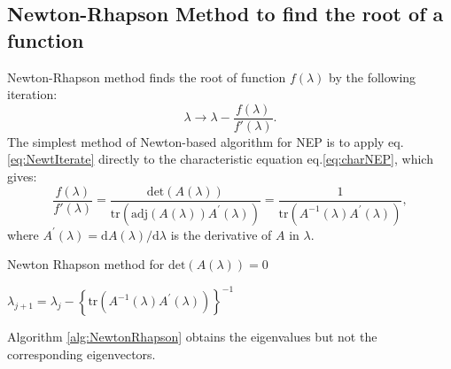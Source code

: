 \documentclass[11pt,letterpaper]{article}
\newcommand{\diff}{\mathrm{d}}
\begin{document}
\subsection{Newton-Rhapson Method to find the root of a function}
Newton-Rhapson method finds the root of function $f(\lambda)$ by the following iteration:
\begin{equation}
	\label{eq:NewtIterate}
	\lambda \rightarrow \lambda - \frac{f(\lambda)}{f'(\lambda)}.
\end{equation}
The simplest method of Newton-based algorithm for NEP is to apply eq.\ref{eq:NewtIterate} directly to the characteristic equation eq.\ref{eq:charNEP}, which gives:
\begin{equation}\label{eq:NewtonRhapson}
\frac{f(\lambda)}{f'(\lambda)} = \frac{\mathrm{det}(A(\lambda))}{ \mathrm{tr} \left( \mathrm{adj}(A(\lambda))A^{\prime}(\lambda)\right)} = \frac{1}{ \mathrm{tr}\left( A^{-1}(\lambda)A^{\prime}(\lambda)\right)},
\end{equation}
where $A^{\prime}(\lambda)=\diff A(\lambda)/\diff \lambda$ is the derivative of $A$ in $\lambda$. 
\begin{algorithm}
\caption{Newton Rhapson method for $\mathrm{det}(A(\lambda))=0$}
\label{alg:NewtonRhapson}
\begin{algorithmic}
\STATE $\lambda_{j+1} = \lambda_j - \left\lbrace \mathrm{tr}\left( A^{-1}(\lambda)A^{\prime}(\lambda)\right)\right\rbrace^{-1} $
\ENDFOR
\end{algorithmic}
\end{algorithm}
Algorithm \ref{alg:NewtonRhapson} obtains the eigenvalues but not the corresponding eigenvectors.
\end{document}
